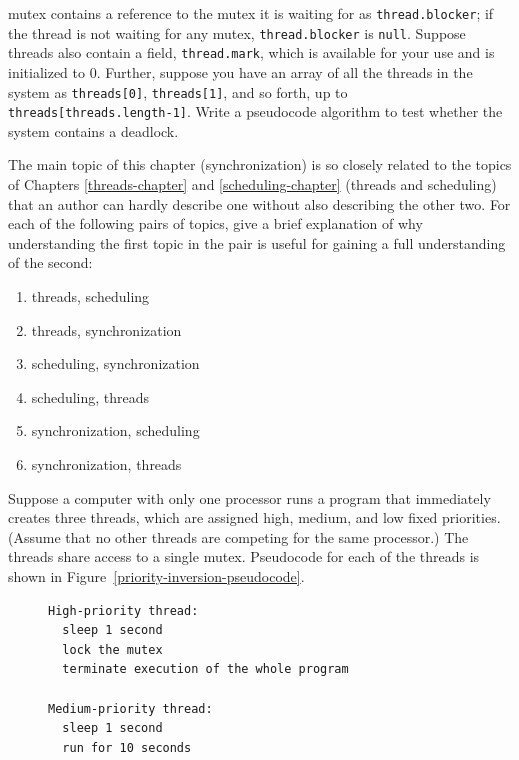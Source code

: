 \begin{chapterEnumerate}
mutex contains a reference to the mutex it is waiting for as
\verb|thread.blocker|; if the thread is not waiting for any mutex,
\verb|thread.blocker| is \verb|null|.  Suppose threads also contain a
field, \verb|thread.mark|, which is available for your use and is
initialized to 0.  Further, suppose you have an array of all the
threads in the system as \verb|threads[0]|, \verb|threads[1]|, and so
forth,
up to \verb|threads[threads.length-1]|.  Write a pseudocode algorithm
to test whether the system contains a deadlock.
\item
The main topic of this chapter (synchronization) is so closely related
to the topics of Chapters \ref{threads-chapter} and
\ref{scheduling-chapter} (threads and scheduling) that
an author can hardly describe one without also describing the other
two.  For each of the following pairs of topics, give a brief
explanation of why understanding the first topic in the pair is useful
for gaining a full understanding of the second:
\begin{enumerate}
\item threads, scheduling
\item threads, synchronization
\item scheduling, synchronization
\item scheduling, threads
\item synchronization, scheduling
\item synchronization, threads
\end{enumerate}
\item\label{priority-inversion-exercise}
Suppose a computer with only one processor runs a program that immediately creates three threads, which are assigned high, medium, and low fixed priorities.  (Assume that no other threads are competing for the same processor.)  The threads share access to a single mutex.  Pseudocode for each of the threads is shown in Figure~\ref{priority-inversion-pseudocode}.
\begin{figure}
\begin{verbatim}
High-priority thread:
  sleep 1 second
  lock the mutex
  terminate execution of the whole program

Medium-priority thread:
  sleep 1 second
  run for 10 seconds


\end{verbatim}
\end{figure}
\end{chapterEnumerate}
